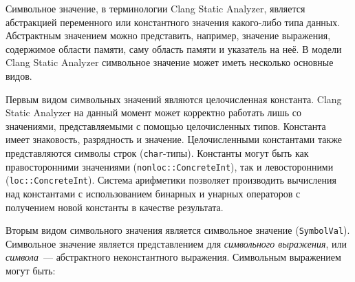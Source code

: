 Символьное значение, в терминологии Clang Static Analyzer, является абстракцией переменного или константного значения какого-либо типа данных. Абстрактным значением можно представить, например, значение выражения, содержимое области памяти, саму область памяти и указатель на неё. В модели Clang Static Analyzer символьное значение может иметь несколько основные видов.

Первым видом символьных значений являются целочисленная константа. Clang Static Analyzer на данный момент может корректно работать лишь со значениями, представляемыми с помощью целочисленных типов. Константа имеет знаковость, разрядность и значение. Целочисленными константами также представляются символы строк (\texttt{char}-типы). Константы могут быть как правосторонними значениями (\texttt{nonloc::ConcreteInt}), так и левосторонними (\texttt{loc::ConcreteInt}). Система арифметики позволяет производить вычисления над константами с использованием бинарных и унарных операторов с получением новой константы в качестве результата.

Вторым видом символьного значения является символьное значение (\texttt{SymbolVal}). Символьное значение является представлением для \textit{символьного выражения}, или \textit{символа}~--- абстрактного неконстантного выражения. Символьным выражением могут быть:

